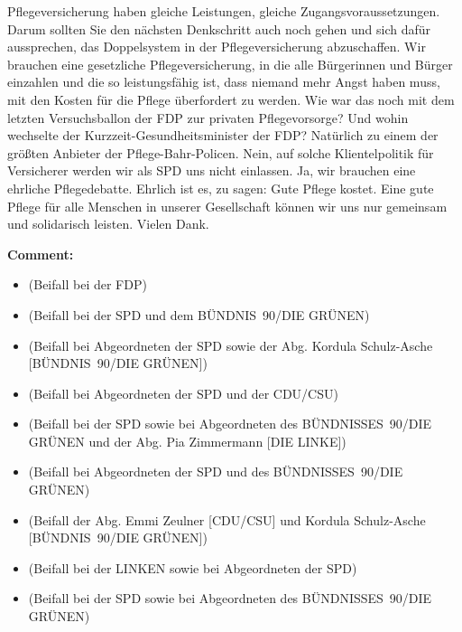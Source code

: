 \documentclass{article}
\begin{document}
Pflegeversicherung haben gleiche Leistungen, gleiche Zugangsvoraussetzungen. Darum sollten Sie den nächsten Denkschritt auch noch gehen und sich dafür aussprechen, das Doppelsystem in der Pflegeversicherung abzuschaffen.  Wir brauchen eine gesetzliche Pflegeversicherung, in die alle Bürgerinnen und Bürger einzahlen und die so leistungsfähig ist, dass niemand mehr Angst haben muss, mit den Kosten für die Pflege überfordert zu werden. Wie war das noch mit dem letzten Versuchsballon der FDP zur privaten Pflegevorsorge? Und wohin wechselte der Kurzzeit-Gesundheitsminister der FDP? Natürlich zu einem der größten Anbieter der Pflege-Bahr-Policen. Nein, auf solche Klientelpolitik für Versicherer werden wir als SPD uns nicht einlassen. Ja, wir brauchen eine ehrliche Pflegedebatte. Ehrlich ist es, zu sagen: Gute Pflege kostet. Eine gute Pflege für alle Menschen in unserer Gesellschaft können wir uns nur gemeinsam und solidarisch leisten. Vielen Dank.  

\noindent\textbf{Comment:}
\begin{itemize}
    \setlength\itemsep{-3pt}
    \item (Beifall bei der FDP)
    \setlength\itemsep{-3pt}
    \item (Beifall bei der SPD und dem BÜNDNIS 90/DIE GRÜNEN)
    \setlength\itemsep{-3pt}
    \item (Beifall bei Abgeordneten der SPD sowie der Abg. Kordula Schulz-Asche [BÜNDNIS 90/DIE GRÜNEN])
    \setlength\itemsep{-3pt}
    \item (Beifall bei Abgeordneten der SPD und der CDU/CSU)
    \setlength\itemsep{-3pt}
    \item (Beifall bei der SPD sowie bei Abgeordneten des BÜNDNISSES 90/DIE GRÜNEN und der Abg. Pia Zimmermann [DIE LINKE])
    \setlength\itemsep{-3pt}
    \item (Beifall bei Abgeordneten der SPD und des BÜNDNISSES 90/DIE GRÜNEN)
    \setlength\itemsep{-3pt}
    \item (Beifall der Abg. Emmi Zeulner [CDU/CSU] und Kordula Schulz-Asche [BÜNDNIS 90/DIE GRÜNEN])
    \setlength\itemsep{-3pt}
    \item (Beifall bei der LINKEN sowie bei Abgeordneten der SPD)
    \setlength\itemsep{-3pt}
    \item (Beifall bei der SPD sowie bei Abgeordneten des BÜNDNISSES 90/DIE GRÜNEN)
\end{itemize}
\end{document}
